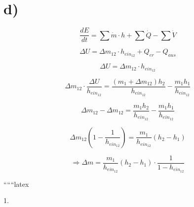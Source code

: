 

\section*{d)}

\[
\frac{dE}{dt} = \sum \dot{m} \cdot h + \sum \dot{Q} - \sum \dot{V}
\]

\[
\Delta U = \Delta m_{12} \cdot h_{ein_{12}} + Q_{er} - Q_{aus}
\]

\[
\Delta U = \Delta m_{12} \cdot h_{ein_{12}}
\]

\[
\Delta m_{12} \cdot \frac{\Delta U}{h_{ein_{12}}} = \frac{(m_1 + \Delta m_{12}) h_2}{h_{ein_{12}}} - \frac{m_1 h_1}{h_{ein_{12}}}
\]

\[
\Delta m_{12} - \Delta m_{12} = \frac{m_1 h_2}{h_{ein_{12}}} - \frac{m_1 h_1}{h_{ein_{12}}}
\]

\[
\Delta m_{12} \left( 1 - \frac{1}{h_{ein_{12}}} \right) = \frac{m_1}{h_{ein_{12}}} (h_2 - h_1)
\]

\[
\Rightarrow \Delta m = \frac{m_1}{h_{ein_{12}}} (h_2 - h_1) \cdot \frac{1}{1 - h_{ein_{12}}}
\]

``````latex


1.